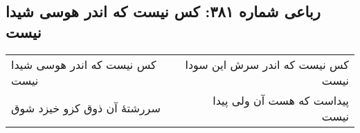 \begin{center}
\section*{رباعی شماره ۳۸۱: کس نیست که اندر هوسی شیدا نیست}
\label{sec:0381}
\begin{longtable}{l p{0.5cm} r}
کس نیست که اندر هوسی شیدا نیست
&&
کس نیست که اندر سرش این سودا نیست
\\
سررشتهٔ آن ذوق کزو خیزد شوق
&&
پیداست که هست آن ولی پیدا نیست
\\
\end{longtable}
\end{center}
